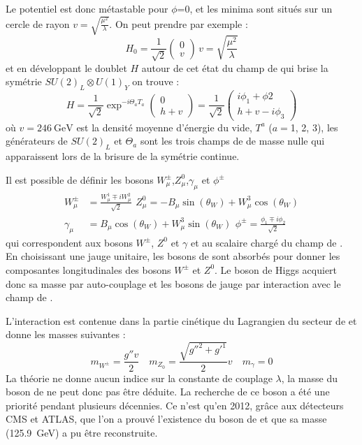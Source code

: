 Le potentiel est donc métastable pour $\phi$=0, et les minima sont situés sur un cercle de rayon $v=\sqrt{\frac{\mu^{2}}{\lambda}}$. On peut prendre par exemple :
\begin{equation}
H_{0}=\frac{1}{\sqrt{2}}\begin{pmatrix} 
0\\
v
\end{pmatrix} \, v=\sqrt{\frac{\mu^{2}}{\lambda}}
\end{equation}
et en développant le doublet $H$ autour de cet état du champ de  qui brise la symétrie $SU(2)_{L}\otimes U(1)_{Y}$ on trouve : 
\begin{equation}
H=\frac{1}{\sqrt{2}}\exp^{-i\Theta_{a}T_{a}}\begin{pmatrix} 
0\\
h+v
\end{pmatrix}=\frac{1}{\sqrt{2}}\begin{pmatrix} 
i\phi_{1}+\phi{2}\\
h+v-i\phi_{3}
\end{pmatrix}
\end{equation}
où $v=\SI{246}{\giga\eV}$ est la densité moyenne d'énergie du vide, $T^{a}$ ($a=$\num{1}, \num{2}, \num{3}), les générateurs de $SU(2)_{L}$ et $\Theta_{a}$ sont les trois champs de  de masse nulle qui apparaissent lors de la brisure de la symétrie continue.

Il est possible de définir les bosons $W_{\mu}^{\pm}$,$Z_{\mu}^{0}$,$\gamma_{\mu}$ et $\phi^{\pm}$ 
\begin{equation}
\begin{split}
W_{\mu}^{\pm}&=\frac{W_{\mu}^{1}\mp iW_{\mu}^{2}}{\sqrt{2}}\, \ Z_{\mu}^{0}=-B_{\mu}\sin(\theta_{W})+W_{\mu}^{3}\cos(\theta_{W})\\
\gamma_{\mu}&=B_{\mu}\cos(\theta_{W})+W_{\mu}^{3}\sin(\theta_{W})\, \ \phi^{\pm}=\frac{\phi_{1}\mp i\phi_{2}}{\sqrt{2}}
\end{split}
\end{equation}
qui correspondent aux bosons $W^{\pm}$, $Z^{0}$ et $\gamma$ et au scalaire chargé du champ de . En choisissant une jauge unitaire, les bosons de  sont absorbés pour donner les composantes longitudinales des bosons $W^{\pm}$ et $Z^{0}$. Le boson de Higgs acquiert donc sa masse par auto-couplage et les bosons de jauge par interaction avec le champ de .

L'interaction est contenue dans la partie cinétique du Lagrangien du secteur de  et donne les masses suivantes : 
\begin{equation}
m_{W^{\pm}}=\frac{g''v}{2} \quad m_{Z_{0}}=\frac{\sqrt{g''^{2}+g'^{1}}}{2}v \quad m_{\gamma}=0 
\end{equation} 
La théorie ne donne aucun indice sur la constante de couplage $\lambda$, la masse du boson de  ne peut donc pas être déduite. La recherche de ce boson a été une priorité pendant plusieurs décennies. Ce n'est qu'en \num{2012}, grâce aux détecteurs CMS et ATLAS, que l'on a prouvé l'existence du boson de  et que sa masse (\SI{125.9}{\giga\eV}) a pu être reconstruite. 

